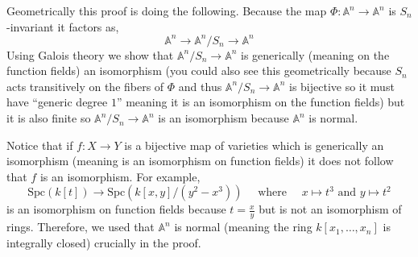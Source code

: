 \documentclass[12pt]{article}
\newcommand{\A}{\mathbb{A}}
\begin{document}
\begin{rmk}
Geometrically this proof is doing the following.  Because the map $\Phi : \A^n \to \A^n$ is $S_n$-invariant it factors as,
\[ \A^n \to \A^n/S_n \to \A^n \]
Using Galois theory we show that $\A^n/S_n \to \A^n$ is generically (meaning on the function fields) an isomorphism (you could also see this geometrically because $S_n$ acts transitively on the fibers of $\Phi$ and thus $\A^n/S_n \to \A^n$ is bijective so it must have ``generic degree $1$'' meaning it is an isomorphism on the function fields) but it is also finite so $\A^n / S_n \to \A^n$ is an isomorphism because $\A^n$ is normal. 
\end{rmk}

\begin{rmk}
Notice that if $f : X \to Y$ is a bijective map of varieties which is generically an isomorphism (meaning is an isomorphism on function fields) it does not follow that $f$ is an isomorphism. For example,
\[ \mathrm{Spc}(k[t]) \to \mathrm{Spc}(k[x,y]/(y^2 - x^3)) \quad \text{ where } \quad x \mapsto t^3 \text{ and } y \mapsto t^2 \]
is an isomorphism on function fields because $t = \frac{x}{y}$ but is not an isomorphism of rings. Therefore, we used that $\A^n$ is normal (meaning the ring $k[x_1, \dots, x_n]$ is integrally closed) crucially in the proof.
\end{rmk}
\end{document}
